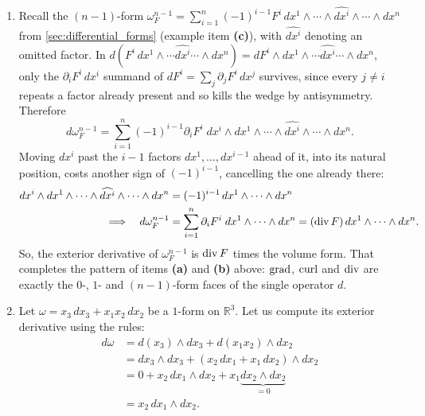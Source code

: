 \begin{example}
\begin{enumerate}[label=\textbf{(\alph*)}]
  \item Recall the $(n-1)$-form $\omega_F^{n-1} =
  \sum_{i=1}^n(-1)^{i-1}F^i\,dx^1\wedge\cdots\wedge\widehat{dx^i}\wedge\cdots\wedge dx^n$ from
  \cref{sec:differential_forms} (example item \textbf{(c)}), with $\widehat{dx^i}$ denoting an
  omitted factor. In $d(F^i\,dx^1\wedge\cdots\widehat{dx^i}\cdots\wedge dx^n) =
  dF^i\wedge dx^1\wedge\cdots\widehat{dx^i}\cdots\wedge dx^n$, only the $\partial_iF^i\,dx^i$
  summand of $dF^i = \sum_j\partial_jF^i\,dx^j$ survives, since every $j\neq i$ repeats a factor
  already present and so kills the wedge by antisymmetry. Therefore
  \[d\omega_F^{n-1} = \sum_{i=1}^n(-1)^{i-1}\partial_iF^i\;dx^i\wedge dx^1\wedge\cdots\wedge
    \widehat{dx^i}\wedge\cdots\wedge dx^n.\]
  Moving $dx^i$ past the $i-1$ factors $dx^1,\dots,dx^{i-1}$ ahead of it, into its natural
  position, costs another sign of $(-1)^{i-1}$, cancelling the one already there:
  \begin{align*}
    dx^i\wedge dx^1\wedge\cdots\wedge\widehat{dx^i}\wedge\cdots\wedge dx^n
      &= (-1)^{i-1}\,dx^1\wedge\cdots\wedge dx^n \\
    \Longrightarrow\quad
      d\omega_F^{n-1} &= \sum_{i=1}^n\partial_iF^i\;dx^1\wedge\cdots\wedge dx^n
      = (\operatorname{div} F)\,dx^1\wedge\cdots\wedge dx^n.
  \end{align*}
  So, the exterior derivative of $\omega_F^{n-1}$ is $\operatorname{div} F$ times the volume form. That
  completes the pattern of items \textbf{(a)} and \textbf{(b)} above: $\operatorname{grad}$, $\operatorname{curl}$ and
  $\operatorname{div}$ are exactly the $0$-, $1$- and $(n-1)$-form faces of the single operator $d$.

  \item Let $\omega = x_3 \,dx_3 + x_1 x_2 \,dx_2$ be a $1$-form on $\mathbb{R}^3$. Let us compute its exterior derivative using the rules:
  \begin{align*}
  d\omega &= d(x_3) \wedge dx_3 + d(x_1 x_2) \wedge dx_2 \\
  &= dx_3 \wedge dx_3 + (x_2 \,dx_1 + x_1 \,dx_2) \wedge dx_2 \\
  &= 0 + x_2 \,dx_1 \wedge dx_2 + x_1 \underbrace{dx_2 \wedge dx_2}_{=0} \\
  &= x_2 \,dx_1 \wedge dx_2.
  \end{align*}
\end{enumerate}
\end{example}

